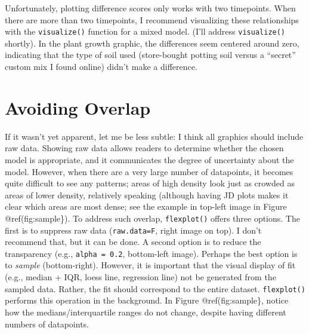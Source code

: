 \documentclass[,]{book}
\begin{document}
Unfortunately, plotting difference scores only works with two
timepoints. When there are more than two timepoints, I recommend
visualizing these relationships with the \texttt{visualize()} function
for a mixed model. (I'll address \texttt{visualize()} shortly). In the
plant growth graphic, the differences seem centered around zero,
indicating that the type of soil used (store-bought potting soil versus
a ``secret'' custom mix I found online) didn't make a difference.

\section*{Avoiding Overlap}\label{avoiding-overlap}

If it wasn't yet apparent, let me be less subtle: I think all graphics
should include raw data. Showing raw data allows readers to determine
whether the chosen model is appropriate, and it communicates the degree
of uncertainty about the model. However, when there are a very large
number of datapoints, it becomes quite difficult to see any patterns;
areas of high density look just as crowded as areas of lower density,
relatively speaking (although having JD plots makes it clear which areas
are most dense; see the example in top-left image in Figure
@ref(fig:sample\}). To address such overlap, \texttt{flexplot()} offers
three options. The first is to suppress raw data (\texttt{raw.data=F},
right image on top). I don't recommend that, but it can be done. A
second option is to reduce the transparency (e.g.,
\texttt{alpha\ =\ 0.2}, bottom-left image). Perhaps the best option is
to \emph{sample} (bottom-right). However, it is important that the
visual display of fit (e.g., median + IQR, loess line, regression line)
not be generated from the sampled data. Rather, the fit should
correspond to the entire dataset. \texttt{flexplot()} performs this
operation in the background. In Figure @ref(fig:sample\}, notice how the
medians/interquartile ranges do not change, despite having different
numbers of datapoints.
\end{document}
